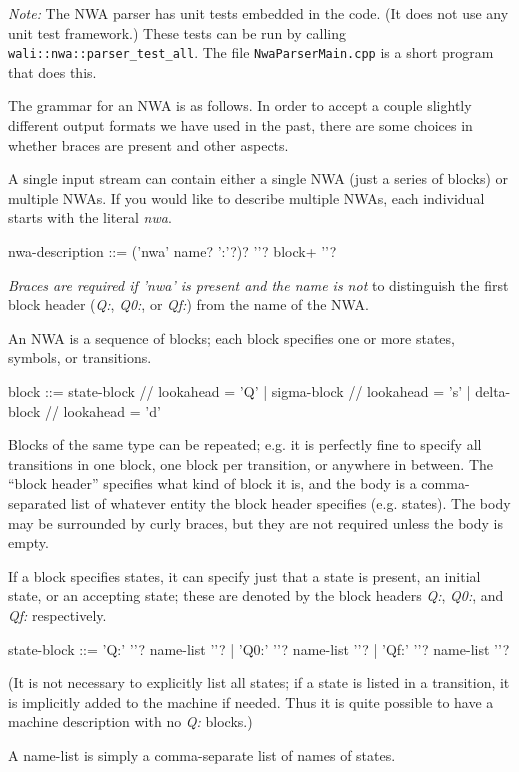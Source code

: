 \textsl{Note:} The NWA parser has unit tests embedded in the code. (It
does not use any unit test framework.) These tests can be run by
calling \texttt{wali::nwa::parser\_test\_all}. The file
\texttt{NwaParserMain.cpp} is a short program that does this.


The grammar for an NWA is as follows. In order to accept a couple
slightly different output formats we have used in the past, there are
some choices in whether braces are present and other aspects.


A single input stream can contain either a single NWA (just a series
of blocks) or multiple NWAs. If you would like to describe multiple
NWAs, each individual starts with the literal \textsl{nwa}.

  nwa-description  ::= ('nwa' name? ':'?)? '{'? block+ '}'?

 \textsl{Braces are required if 'nwa' is present and the name is not}
 to distinguish the first block header (\textsl{Q:}, \textsl{Q0:}, or
 \textsl{Qf:}) from the name of the NWA.

An NWA is a sequence of blocks; each block specifies one or more
states, symbols, or transitions.

  block  ::=  state-block     // lookahead = 'Q'
           |  sigma-block     // lookahead = 's'
           |  delta-block     // lookahead = 'd'

Blocks of the same type can be repeated; e.g. it is perfectly fine to
specify all transitions in one block, one block per transition, or
anywhere in between. The ``block header'' specifies what kind of block
it is, and the body is a comma-separated list of whatever entity the
block header specifies (e.g. states). The body may be surrounded by
curly braces, but they are not required unless the body is empty.

If a block specifies states, it can specify just that a state is
present, an initial state, or an accepting state; these are denoted by
the block headers \textsl{Q:}, \textsl{Q0:}, and \textsl{Qf:}
respectively.
 
  state-block  ::=  'Q:'   '{'?  name-list  '}'?
                 |  'Q0:'  '{'?  name-list  '}'?
                 |  'Qf:'  '{'?  name-list  '}'?

(It is not necessary to explicitly list all states; if a state is
listed in a transition, it is implicitly added to the machine if
needed. Thus it is quite possible to have a machine description with
no \textsl{Q:} blocks.)

A name-list is simply a comma-separate list of names of states.

